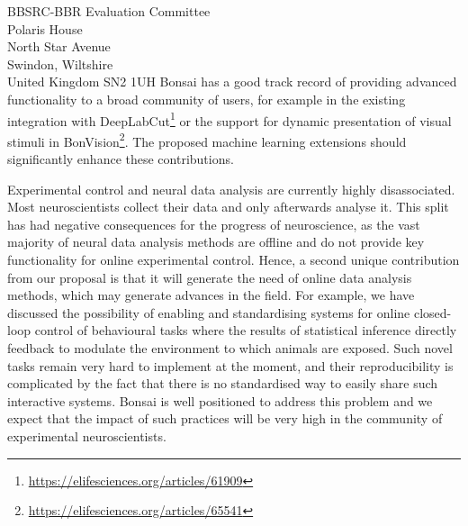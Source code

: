 \documentclass[12pt]{letter}
\begin{document}
\begin{letter}{
    BBSRC-BBR Evaluation Committee\\
    Polaris House\\
    North Star Avenue\\
    Swindon, Wiltshire\\
    United Kingdom SN2 1UH
}
Bonsai has a good track record of providing advanced functionality to a broad
community of users, for example in the existing integration with
DeepLabCut\footnote{\url{https://elifesciences.org/articles/61909}} or the
support for dynamic presentation of visual stimuli in
BonVision\footnote{\url{https://elifesciences.org/articles/65541}}. The
proposed machine learning extensions should significantly enhance these
contributions.

Experimental control and neural data analysis are currently highly
disassociated. Most neuroscientists collect their data and only afterwards
analyse it. This split has had negative consequences for the progress of
neuroscience, as the vast majority of neural data analysis methods are offline
and do not provide key functionality for online experimental control. Hence, a
second unique contribution from our proposal is that it will generate the need
of online data analysis methods, which may generate advances in the field. For
example, we have discussed the possibility of enabling and standardising
systems for online closed-loop control of behavioural tasks where the results
of statistical inference directly feedback to modulate the environment to which
animals are exposed. Such novel tasks remain very hard to implement at the
moment, and their reproducibility is complicated by the fact that there is no
standardised way to easily share such interactive systems. Bonsai is well
positioned to address this problem and we expect that the impact of such
practices will be very high in the community of experimental neuroscientists.

\end{letter}
\end{document}
